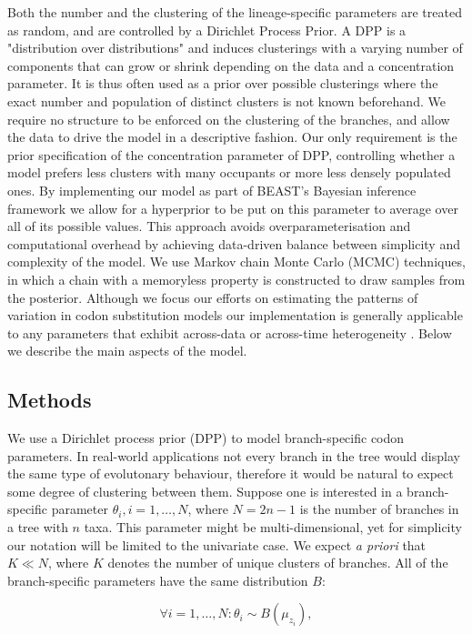 Both the number and the clustering of the lineage-specific parameters are treated as random, and are controlled by a Dirichlet Process Prior.
A DPP is a "distribution over distributions" and induces clusterings with a varying number of components that can grow or shrink depending on the data and a concentration parameter.
It is thus often used as a prior over possible clusterings where the exact number and population of distinct clusters is not known beforehand.
We require no structure to be enforced on the clustering of the branches, and allow the data to drive the model in a descriptive fashion. 
Our only requirement is the prior specification of the concentration parameter of DPP, controlling whether a model prefers less clusters with many occupants or more less densely populated ones. 
By implementing our model as part of BEAST's Bayesian inference framework we allow for a hyperprior to be put on this parameter to average over all of its possible values. 
This approach avoids overparameterisation and computational overhead by achieving data-driven balance between simplicity and complexity of the model.
We use Markov chain Monte Carlo (MCMC) techniques, in which a chain with a memoryless property is constructed to draw samples from the posterior.
Although we focus our efforts on estimating the patterns of variation in codon substitution models our implementation is generally applicable to any parameters that exhibit across-data or across-time heterogeneity .
Below we describe the main aspects of the model.

\subsection{Methods}

We use a Dirichlet process prior (DPP) to model branch-specific codon parameters.
In real-world applications not every branch in the tree would display the same type of evolutonary behaviour, therefore it would be natural to expect some degree of clustering between them.
Suppose one is interested in a branch-specific parameter $\theta_{i}, i=1,\ldots,N$, where $N=2n-1$ is the number of branches in a tree with $n$ taxa. 
This parameter might be multi-dimensional, yet for simplicity our notation will be limited to the univariate case.
We expect \emph{a priori} that $K\ll N$, where $K$ denotes the number of unique clusters of branches.
All of the branch-specific parameters have the same distribution $B$:

\begin{equation}
\forall i=1,\ldots,N: \theta_{i}\sim B(\mu_{z_{i}}),
\label{eq:dpp1}
\end{equation}

